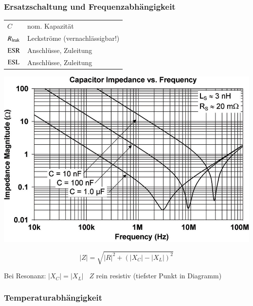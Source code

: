 \subsubsection{Ersatzschaltung und Frequenzabhängigkeit}

\begin{minipage}[c]{0.48\columnwidth}

    \begin{tabular}{ll@{}}
        $C$             & nom. Kapazität  \\
        $R_{\rm leak}$  & Leckströme (vernachlässigbar!) \\
        $\rm{ESR}$      & Anschlüsse, Zuleitung \\ 
        $\rm{ESL}$      & Anschlüsse, Zuleitung 
    \end{tabular}
\end{minipage}
\hfill
\begin{minipage}[c]{0.5\columnwidth}
    \includegraphics[width=\columnwidth]{images/realer_kondensator_frequenzverlauf.jpg}
\end{minipage}

\begin{minipage}[c]{0.48\columnwidth}
    $$ \boxed{ |Z| = \sqrt{|R|^2 + (|X_{C}| - |X_L|)^2 } } $$
\end{minipage}
\hfill
\begin{minipage}[c]{0.48\columnwidth}
    Bei Resonanz: $ |X_C| = |X_L|$ \textrightarrow\ $Z$ rein resistiv (tiefster Punkt in Diagramm)
\end{minipage}


\subsubsection{Temperaturabhängigkeit}


